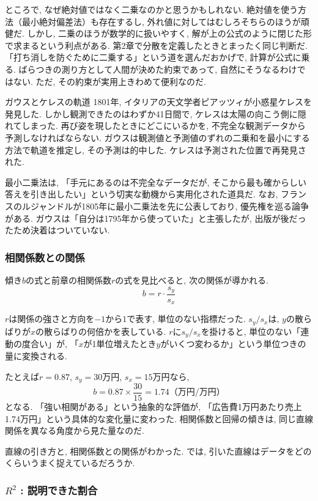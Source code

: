 ところで, なぜ絶対値ではなく二乗なのかと思うかもしれない.
絶対値を使う方法（最小絶対偏差法）も存在するし, 外れ値に対してはむしろそちらのほうが頑健だ.
しかし, 二乗のほうが数学的に扱いやすく, 解が上の公式のように閉じた形で求まるという利点がある.
第2章で分散を定義したときとまったく同じ判断だ.
「打ち消しを防ぐために二乗する」という道を選んだおかげで, 計算が公式に乗る.
ばらつきの測り方として人間が決めた約束であって, 自然にそうなるわけではない.
ただ, その約束が実用上きわめて便利なのだ.

\begin{mybox}{ガウスとケレスの軌道}
1801年, イタリアの天文学者ピアッツィが小惑星ケレスを発見した.
しかし観測できたのはわずか41日間で, ケレスは太陽の向こう側に隠れてしまった.
再び姿を現したときにどこにいるかを, 不完全な観測データから予測しなければならない.
ガウスは観測値と予測値のずれの二乗和を最小にする方法で軌道を推定し, その予測は的中した.
ケレスは予測された位置で再発見された.

最小二乗法は, 「手元にあるのは不完全なデータだが, そこから最も確からしい答えを引き出したい」という切実な動機から実用化された道具だ.
なお, フランスのルジャンドルが1805年に最小二乗法を先に公表しており, 優先権を巡る論争がある.
ガウスは「自分は1795年から使っていた」と主張したが, 出版が後だったため決着はついていない.
\end{mybox}


\subsubsection*{相関係数との関係}

傾き$b$の式と前章の相関係数$r$の式を見比べると, 次の関係が導かれる.
\[
  b = r \cdot \frac{s_y}{s_x}
\]

$r$は関係の強さと方向を$-1$から$1$で表す, 単位のない指標だった.
$s_y / s_x$は, $y$の散らばりが$x$の散らばりの何倍かを表している.
$r$に$s_y / s_x$を掛けると, 単位のない「連動の度合い」が, 「$x$が1単位増えたとき$y$がいくつ変わるか」という単位つきの量に変換される.

たとえば$r = 0.87$, $s_y = 30$万円, $s_x = 15$万円なら,
\[
  b = 0.87 \times \frac{30}{15} = 1.74 \text{（万円/万円）}
\]
となる.
「強い相関がある」という抽象的な評価が, 「広告費1万円あたり売上1.74万円」という具体的な変化量に変わった.
相関係数と回帰の傾きは, 同じ直線関係を異なる角度から見た量なのだ.

直線の引き方と, 相関係数との関係がわかった.
では, 引いた直線はデータをどのくらいうまく捉えているだろうか.

\subsubsection*{$R^2$ : 説明できた割合}

